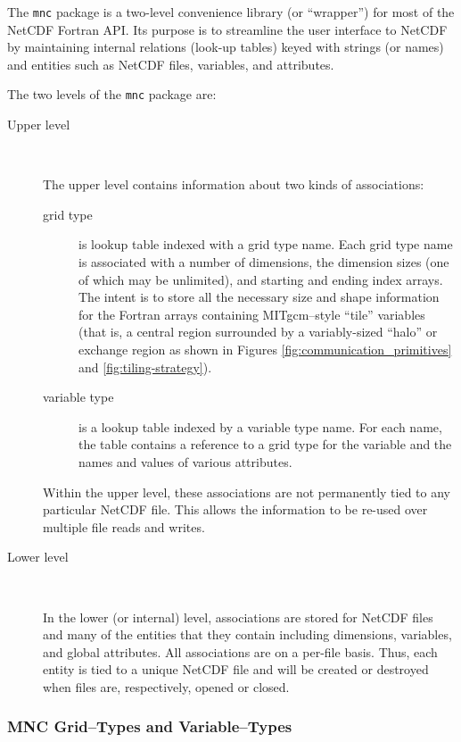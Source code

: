 The \texttt{mnc} package is a two-level convenience library (or
``wrapper'') for most of the NetCDF Fortran API.  Its purpose is to
streamline the user interface to NetCDF by maintaining internal
relations (look-up tables) keyed with strings (or names) and entities
such as NetCDF files, variables, and attributes.

The two levels of the \texttt{mnc} package are:
\begin{description}

\item[Upper level] \ 
  
  The upper level contains information about two kinds of
  associations:
  \begin{description}
  \item[grid type] is lookup table indexed with a grid type name.
    Each grid type name is associated with a number of dimensions, the
    dimension sizes (one of which may be unlimited), and starting and
    ending index arrays.  The intent is to store all the necessary
    size and shape information for the Fortran arrays containing
    MITgcm--style ``tile'' variables (that is, a central region
    surrounded by a variably-sized ``halo'' or exchange region as
    shown in Figures \ref{fig:communication_primitives} and
    \ref{fig:tiling-strategy}).
  
  \item[variable type] is a lookup table indexed by a variable type
    name.  For each name, the table contains a reference to a grid
    type for the variable and the names and values of various
    attributes.
  \end{description}
  
  Within the upper level, these associations are not permanently tied
  to any particular NetCDF file.  This allows the information to be
  re-used over multiple file reads and writes.

\item[Lower level] \ 
  
  In the lower (or internal) level, associations are stored for NetCDF
  files and many of the entities that they contain including
  dimensions, variables, and global attributes.  All associations are
  on a per-file basis.  Thus, each entity is tied to a unique NetCDF
  file and will be created or destroyed when files are, respectively,
  opened or closed.

\end{description}


\subsubsection{MNC Grid--Types and Variable--Types}

